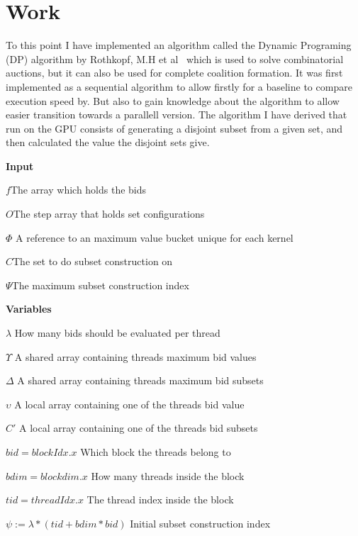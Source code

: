 \documentclass[a4paper, 12pt]{report}
\begin{document}
\chapter*{Work}

To this point I have implemented an algorithm called the Dynamic Programing (DP) algorithm by Rothkopf, M.H et al~\cite{rothkopf1998computationally} which is used to solve combinatorial auctions, but it can also be used for complete coalition formation. It was first implemented as a sequential algorithm to allow firstly for a baseline to compare execution speed by. But also to gain knowledge about the algorithm to allow easier transition towards a parallell version. The algorithm I have derived that run on the GPU consists of generating a disjoint subset from a given set, and then calculated the value the disjoint sets give.

\thispagestyle{empty}

\thispagestyle{empty}
\pagestyle{empty}
\textbf{Input}

$f$\hfill The array which holds the bids

$O$\hfill The step array that holds set configurations

$ \Phi $ \hfill A reference to an maximum value bucket unique for each kernel

$C$\hfill The set to do subset construction on

$\Psi$\hfill The maximum subset construction index


\textbf{Variables} 

$\lambda$ \hfill How many bids should be evaluated per thread

$\Upsilon$ \hfill A shared array containing threads maximum bid values

$\Delta$ \hfill A shared array containing threads maximum bid subsets

$\upsilon$ \hfill A local array containing one of the threads bid value

$C'$ \hfill A local array containing one of the threads bid subsets

$bid = blockIdx.x$ \hfill Which block the threads belong to

$bdim = blockdim.x$ \hfill How many threads inside the block

$tid = threadIdx.x$ \hfill The thread index inside the block

$\psi := \lambda*(tid+bdim*bid)$ \hfill Initial subset construction index
\end{document}
